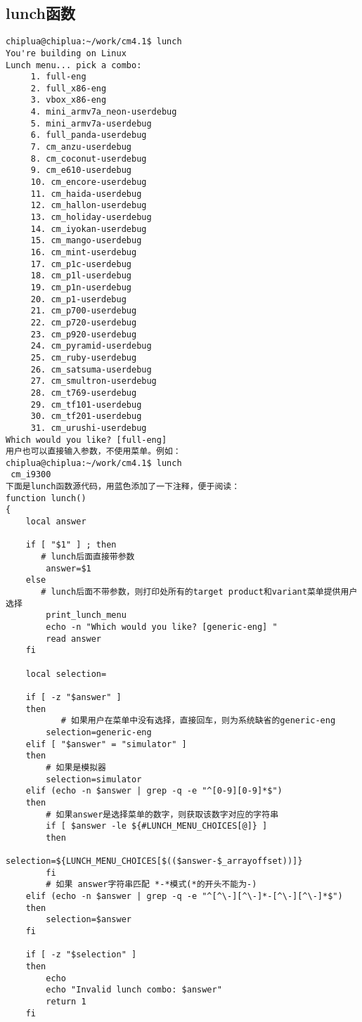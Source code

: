 \documentclass[12pt,a4paper]{article}
\begin{document}
\subsection{lunch函数}
\begin{verbatim}
chiplua@chiplua:~/work/cm4.1$ lunch
You're building on Linux
Lunch menu... pick a combo:
     1. full-eng
     2. full_x86-eng
     3. vbox_x86-eng
     4. mini_armv7a_neon-userdebug
     5. mini_armv7a-userdebug
     6. full_panda-userdebug
     7. cm_anzu-userdebug
     8. cm_coconut-userdebug
     9. cm_e610-userdebug
     10. cm_encore-userdebug
     11. cm_haida-userdebug
     12. cm_hallon-userdebug
     13. cm_holiday-userdebug
     14. cm_iyokan-userdebug
     15. cm_mango-userdebug
     16. cm_mint-userdebug
     17. cm_p1c-userdebug
     18. cm_p1l-userdebug
     19. cm_p1n-userdebug
     20. cm_p1-userdebug
     21. cm_p700-userdebug
     22. cm_p720-userdebug
     23. cm_p920-userdebug
     24. cm_pyramid-userdebug
     25. cm_ruby-userdebug
     26. cm_satsuma-userdebug
     27. cm_smultron-userdebug
     28. cm_t769-userdebug
     29. cm_tf101-userdebug
     30. cm_tf201-userdebug
     31. cm_urushi-userdebug
Which would you like? [full-eng] 
用户也可以直接输入参数，不使用菜单。例如：
chiplua@chiplua:~/work/cm4.1$ lunch
 cm_i9300
下面是lunch函数源代码，用蓝色添加了一下注释，便于阅读：
function lunch()
{
    local answer

    if [ "$1" ] ; then
       # lunch后面直接带参数
        answer=$1
    else
       # lunch后面不带参数，则打印处所有的target product和variant菜单提供用户选择
        print_lunch_menu   
        echo -n "Which would you like? [generic-eng] "
        read answer
    fi

    local selection=

    if [ -z "$answer" ]
    then
           # 如果用户在菜单中没有选择，直接回车，则为系统缺省的generic-eng
        selection=generic-eng
    elif [ "$answer" = "simulator" ]
    then
        # 如果是模拟器
        selection=simulator
    elif (echo -n $answer | grep -q -e "^[0-9][0-9]*$")
    then
        # 如果answer是选择菜单的数字，则获取该数字对应的字符串
        if [ $answer -le ${#LUNCH_MENU_CHOICES[@]} ]
        then
            selection=${LUNCH_MENU_CHOICES[$(($answer-$_arrayoffset))]}
        fi
        # 如果 answer字符串匹配 *-*模式(*的开头不能为-)
    elif (echo -n $answer | grep -q -e "^[^\-][^\-]*-[^\-][^\-]*$")
    then
        selection=$answer
    fi

    if [ -z "$selection" ]
    then
        echo
        echo "Invalid lunch combo: $answer"
        return 1
    fi


\end{verbatim}
\end{document}
